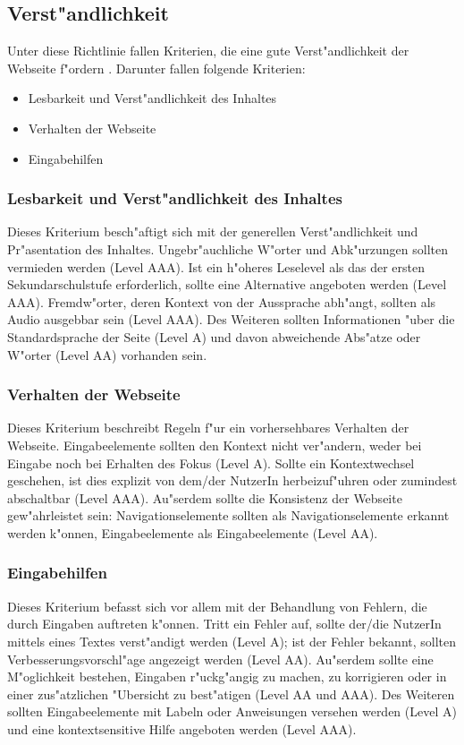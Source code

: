 \documentclass[a4paper,bibtotoc,oneside]{scrbook}
\begin{document}
\subsection{Verst"andlichkeit}
Unter diese Richtlinie fallen Kriterien, die eine gute Verst"andlichkeit der Webseite f"ordern \cite[Abschnitt 3]{wcag2}. Darunter fallen folgende Kriterien: 

\begin{itemize}
\item Lesbarkeit und Verst"andlichkeit des Inhaltes \cite[Abschnitt 3.1]{wcag2}
\item Verhalten der Webseite \cite[Abschnitt 3.2]{wcag2}
\item Eingabehilfen \cite[Abschnitt 3.3]{wcag2}
\end{itemize}

\subsubsection{Lesbarkeit und Verst"andlichkeit des Inhaltes}
Dieses Kriterium besch"aftigt sich mit der generellen Verst"andlichkeit und Pr"asentation des Inhaltes. Ungebr"auchliche W"orter und Abk"urzungen sollten vermieden werden (Level AAA). Ist ein h"oheres Leselevel als das der ersten Sekundarschulstufe erforderlich, sollte eine Alternative angeboten werden (Level AAA). Fremdw"orter, deren Kontext von der Aussprache abh"angt, sollten als Audio ausgebbar sein (Level AAA). Des Weiteren sollten Informationen "uber die Standardsprache der Seite (Level A) und davon abweichende Abs"atze oder W"orter (Level AA) vorhanden sein. \cite[Abschnitt 3.1]{wcag2}

\subsubsection{Verhalten der Webseite}
Dieses Kriterium beschreibt Regeln f"ur ein vorhersehbares Verhalten der Webseite. Eingabeelemente sollten den Kontext nicht ver"andern, weder bei Eingabe noch bei Erhalten des Fokus (Level A). Sollte ein Kontextwechsel geschehen, ist dies explizit von dem/der NutzerIn herbeizuf"uhren oder zumindest abschaltbar (Level AAA). Au"serdem sollte die Konsistenz der Webseite gew"ahrleistet sein: Navigationselemente sollten als Navigationselemente erkannt werden k"onnen, Eingabeelemente als Eingabeelemente (Level AA). \cite[Abschnitt 3.2]{wcag2}

\subsubsection{Eingabehilfen}
Dieses Kriterium befasst sich vor allem mit der Behandlung von Fehlern, die durch Eingaben auftreten k"onnen. Tritt ein Fehler auf, sollte der/die NutzerIn mittels eines Textes verst"andigt werden (Level A); ist der Fehler bekannt, sollten Verbesserungsvorschl"age angezeigt werden (Level AA). Au"serdem sollte eine M"oglichkeit bestehen, Eingaben r"uckg"angig zu machen, zu korrigieren oder in einer zus"atzlichen "Ubersicht zu best"atigen (Level AA und AAA). Des Weiteren sollten Eingabeelemente mit Labeln oder Anweisungen versehen werden (Level A) und eine kontextsensitive Hilfe angeboten werden (Level AAA). \cite[Abschnitt 3.3]{wcag2}
\end{document}
